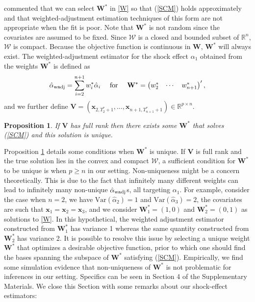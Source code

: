\documentclass[11pt,3p,review,authoryear]{elsarticle}
\newcommand{\R}{\mathbb{R}}
\newcommand{\x}{\textbf{x}}
\def\mbf#1{\mathbf{#1}} %
\newcommand{\reals}{\mathbb{R}} %
\def\mc#1{\mathcal{#1}} %
\def\var#1{\mathrm{Var}(#1)} %
\newtheorem{prop}{Proposition}
\theoremstyle{definition}
\begin{document}
\cite{abadie2010synthetic} commented that we can select $\mbf{W}^*$ in \eqref{W} so that (\ref{SCM}) holds approximately and that weighted-adjustment estimation techniques of this form are not appropriate when the fit is poor. Note that $\mbf{W}^*$ is not random since the covariates are assumed to be fixed. Since $\mc{W}$ is a closed and bounded subset of $\reals^n$,  $\mc{W}$ is compact. Because the objective function is continuous in $\mbf{W}$, $\mbf{W}^*$ will always exist. The weighted-adjustment estimator for the shock effect $\alpha_1$ obtained from the weights $\mbf{W}^*$ is defined as 
  \begin{align*}
    \hat{\alpha}_{\rm wadj} = \sum_{i=2}^{n+1} w_i^*\hat{\alpha}_i
    \quad \text{ for } \quad \mbf{W}^* = \begin{pmatrix}
      w^*_2 & \cdots & w^*_{n+1}
    \end{pmatrix}',
  \end{align*}
and we further define
$
  \mathbf{V} = (\mathbf{x}_{2, T_2^*+1}, \ldots,\mathbf{x}_{n+1, T_{n+1}^*+1}) \in \R^{p \times n}.
$
\begin{prop}
  \label{uniqueness} If $\mathbf{V}$ has full rank then there exists some $\mathbf{W}^*$ that solves (\ref{SCM}) and this solution is unique.
\end{prop} 
Proposition \ref{uniqueness} details some conditions when $\mathbf{W}^*$ is unique. If $\mathbf{V}$ is full rank and the true solution lies in the convex and compact $\mathcal{W}$, a sufficient condition for $\mathbf{W}^*$ to be unique is when $p \geq n$ in our setting. Non-uniqueness might be a concern theoretically. This is due to the fact that infinitely many different weights can lead to infinitely many non-unique $\hat{\alpha}_{\rm wadj}$s, all targeting $\alpha_1$. For example, consider the case when $n = 2$, we have $\var{\hat{\alpha}_2}=1$ and $\var{\hat{\alpha}_3}=2$, the covariates are such that $\x_1 = \x_2 = \x_3$, and we consider $\mathbf{W}^*_1=(1,0)$ and $\mathbf{W}^*_2=(0,1)$ as solutions to \eqref{W}. In this hypothetical, the weighted adjustment estimator constructed from $\mathbf{W}^*_1$ has variance 1 whereas the same quantity constructed from $\mathbf{W}^*_2$ has variance 2. It is possible to resolve this issue by selecting a unique weight $\mbf{W}^*$ that optimizes a desirable objective function, prior to which one should find the bases spanning the subspace of $\mbf{W}^*$ satisfying (\ref{SCM}). Empirically, we find some simulation evidence that non-uniqueness of $\mathbf{W}^*$ is not problematic for inferences in our setting. Specifics can be seen in Section 4 of the Supplementary Materials. We close this Section with some remarks about our shock-effect estimators: 
\end{document}
